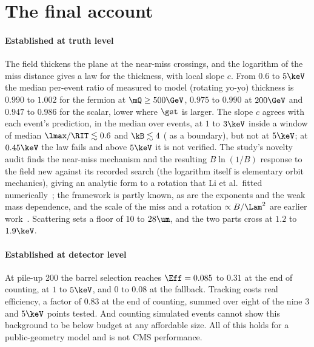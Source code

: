 \section{The final account}\label{sec:29-account}

\paragraph{Established at truth level}
The field thickens the plane at the near-miss crossings, and the logarithm of the miss distance gives a law for the thickness, with local slope $c$. From $0.6$ to $5\keV$ the median per-event ratio of measured to model (rotating yo-yo) thickness is $0.990$ to $1.002$ for the fermion at $\mQ\ge500\GeV$, $0.975$ to $0.990$ at $200\GeV$ and $0.947$ to $0.986$ for the scalar, lower where $\gst$ is larger. The slope $c$ agrees with each event's prediction, in the median over events, at $1$ to $3\keV$ inside a window of median $\lmax/\RIT\lesssim0.6$ and $\kB\lesssim4$ (\EST{} as a boundary), but not at $5\keV$; at $0.45\keV$ the law fails and above $5\keV$ it is not verified. The study's novelty audit finds the near-miss mechanism and the resulting $B\ln(1/B)$ response to the field new against its recorded search (the logarithm itself is elementary orbit mechanics), giving an analytic form to a rotation that Li et al.\ fitted numerically~\cite{Li:2020aoq}; the framework is partly known, as are the exponents and the weak mass dependence, and the scale of the miss and a rotation $\propto B/\Lam^2$ are earlier work~\cite{Kang:2008ea,Knapen:2017kly}. Scattering sets a floor of $10$ to $28\um$, and the two parts cross at $1.2$ to $1.9\keV$.

\paragraph{Established at detector level}
At pile-up 200 the barrel selection reaches $\Eff=0.085$ to $0.31$ at the end of counting, at $1$ to $5\keV$, and $0$ to $0.08$ at the fallback. Tracking costs real efficiency, a factor of $0.83$ at the end of counting, summed over eight of the nine $3$ and $5\keV$ points tested. And counting simulated events cannot show this background to be below budget at any affordable size. All of this holds for a public-geometry model and is not CMS performance.

